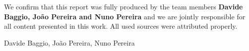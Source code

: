 We confirm that this report was fully produced by the team members \textbf{Davide Baggio, João Pereira and Nuno Pereira} and we are jointly responsible for all content presented in this work. All used sources were attributed properly.

Davide Baggio, João Pereira, Nuno Pereira